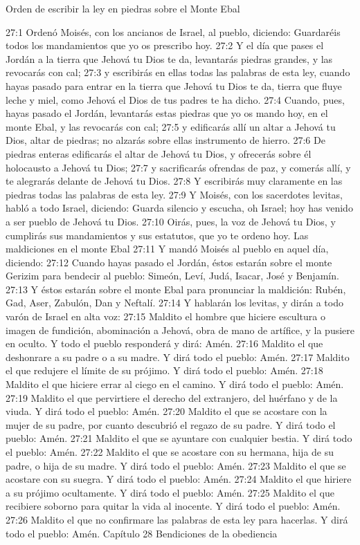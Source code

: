 Orden de escribir la ley en piedras sobre el Monte Ebal  

27:1 Ordenó Moisés, con los ancianos de Israel, al pueblo, diciendo: Guardaréis todos los mandamientos que yo os prescribo hoy.  
27:2 Y el día que pases el Jordán a la tierra que Jehová tu Dios te da, levantarás piedras grandes, y las revocarás con cal; 
27:3 y escribirás en ellas todas las palabras de esta ley, cuando hayas pasado para entrar en la tierra que Jehová tu Dios te da, tierra que fluye leche y miel, como Jehová el Dios de tus padres te ha dicho.  
27:4 Cuando, pues, hayas pasado el Jordán, levantarás estas piedras que yo os mando hoy, en el monte Ebal, y las revocarás con cal;  
27:5 y edificarás allí un altar a Jehová tu Dios, altar de piedras; no alzarás sobre ellas instrumento de hierro.  
27:6 De piedras enteras edificarás el altar de Jehová tu Dios, y ofrecerás sobre él holocausto a Jehová tu Dios;  
27:7 y sacrificarás ofrendas de paz, y comerás allí, y te alegrarás delante de Jehová tu Dios.  
27:8 Y escribirás muy claramente en las piedras todas las palabras de esta ley.  
27:9 Y Moisés, con los sacerdotes levitas, habló a todo Israel, diciendo: Guarda silencio y escucha, oh Israel; hoy has venido a ser pueblo de Jehová tu Dios.  
27:10 Oirás, pues, la voz de Jehová tu Dios, y cumplirás sus mandamientos y sus estatutos, que yo te ordeno hoy.  
Las maldiciones en el monte Ebal  
27:11 Y mandó Moisés al pueblo en aquel día, diciendo:  
27:12 Cuando hayas pasado el Jordán, éstos estarán sobre el monte Gerizim para bendecir al pueblo: Simeón, Leví, Judá, Isacar, José y Benjamín.  
27:13 Y éstos estarán sobre el monte Ebal para pronunciar la maldición: Rubén, Gad, Aser, Zabulón, Dan y Neftalí.  
27:14 Y hablarán los levitas, y dirán a todo varón de Israel en alta voz:  
27:15 Maldito el hombre que hiciere escultura o imagen de fundición, abominación a Jehová, obra de mano de artífice, y la pusiere en oculto. Y todo el pueblo responderá y dirá: Amén.  
27:16 Maldito el que deshonrare a su padre o a su madre. Y dirá todo el pueblo: Amén.  
27:17 Maldito el que redujere el límite de su prójimo. Y dirá todo el pueblo: Amén.  
27:18 Maldito el que hiciere errar al ciego en el camino. Y dirá todo el pueblo: Amén. 
27:19 Maldito el que pervirtiere el derecho del extranjero, del huérfano y de la viuda. Y dirá todo el pueblo: Amén.  
27:20 Maldito el que se acostare con la mujer de su padre, por cuanto descubrió el regazo de su padre. Y dirá todo el pueblo: Amén.  
27:21 Maldito el que se ayuntare con cualquier bestia. Y dirá todo el pueblo: Amén.  
27:22 Maldito el que se acostare con su hermana, hija de su padre, o hija de su madre. Y dirá todo el pueblo: Amén.  
27:23 Maldito el que se acostare con su suegra. Y dirá todo el pueblo: Amén.  
27:24 Maldito el que hiriere a su prójimo ocultamente. Y dirá todo el pueblo: Amén.  
27:25 Maldito el que recibiere soborno para quitar la vida al inocente. Y dirá todo el pueblo: Amén.  
27:26 Maldito el que no confirmare las palabras de esta ley para hacerlas. Y dirá todo el pueblo: Amén.  
Capítulo 28
Bendiciones de la obediencia  


